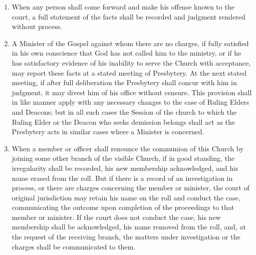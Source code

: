 \documentclass[
]{book}
\begin{document}
\begin{enumerate}
\def\labelenumi{\arabic{enumi}.}
\item
  \protect\hypertarget{41}{\href{}{}}When any person shall come forward and make his offense known to the court, a full statement of the facts shall be recorded and judgment rendered without process.
\item
  A Minister of the Gospel against whom there are no charges, if fully satisfied in his own conscience that God has not called him to the ministry, or if he has satisfactory evidence of his inability to serve the Church with acceptance, may report these facts at a stated meeting of Presbytery. At the next stated meeting, if after full deliberation the Presbytery shall concur with him in judgment, it may divest him of his office without censure. This provision shall in like manner apply with any necessary changes to the case of Ruling Elders and Deacons; but in all such cases the Session of the church to which the Ruling Elder or the Deacon who seeks demission belongs shall act as the Presbytery acts in similar cases where a Minister is concerned.
\item
  When a member or officer shall renounce the communion of this Church by joining some other branch of the visible Church, if in good standing, the irregularity shall be recorded, his new membership acknowledged, and his name erased from the roll. But if there is a record of an investigation in process, or there are charges concerning the member or minister, the court of original jurisdiction may retain his name on the roll and conduct the case, communicating the outcome upon completion of the proceedings to that member or minister. If the court does not conduct the case, his new membership shall be acknowledged, his name removed from the roll, and, at the request of the receiving branch, the matters under investigation or the charges shall be communicated to them.


\end{enumerate}
\end{document}
